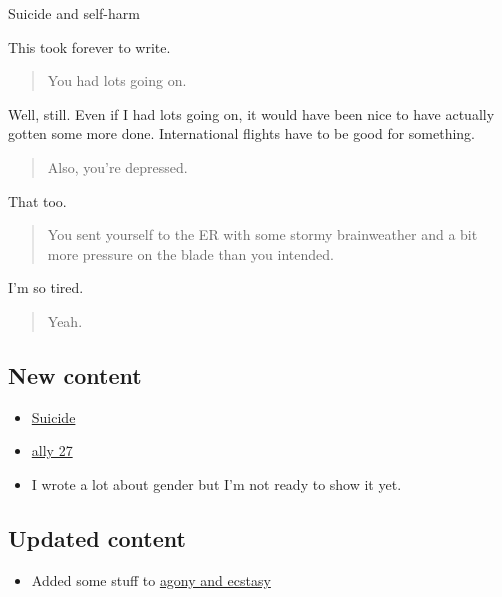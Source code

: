Suicide and self-harm

This took forever to write.

\begin{quote}
You had lots going on.
\end{quote}

Well, still. Even if I had lots going on, it would have been nice to have actually gotten some more done. International flights have to be good for something.

\begin{quote}
Also, you're depressed.
\end{quote}

That too.

\begin{quote}
You sent yourself to the ER with some stormy brainweather and a bit more pressure on the blade than you intended.
\end{quote}

I'm so tired.

\begin{quote}
Yeah.
\end{quote}

\hypertarget{new-content}{%
\subsection{New content}\label{new-content}}

\begin{itemize}
\tightlist
\item
  \href{/self-harm/suicide}{Suicide}
\item
  \href{/27}{ally 27}
\item
  I wrote a lot about gender but I'm not ready to show it yet.
\end{itemize}

\hypertarget{updated-content}{%
\subsection{Updated content}\label{updated-content}}

\begin{itemize}
\tightlist
\item
  Added some stuff to \href{/agony-and-ecstasy}{agony and ecstasy}
\end{itemize}
